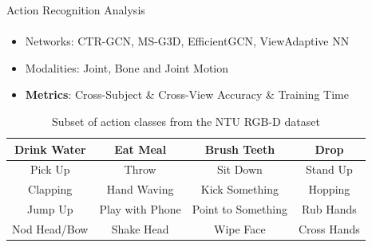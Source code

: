 \documentclass[aspectratio=169, xcolor=dvipsnames]{beamer}
\begin{document}
\begin{frame}{Action Recognition Analysis}
      \framesubtitle{}%
      
      \begin{itemize}
      \item Networks: CTR-GCN, MS-G3D, EfficientGCN, ViewAdaptive NN
      \item Modalities: Joint, Bone and Joint Motion
      \item \textbf{Metrics}: Cross-Subject \& Cross-View Accuracy \& Training Time
      \end{itemize}
      \vfill
      \begin{table}[ht!]
      \centering
      {\footnotesize
      \begin{tabular}{ |c|c|c|c| } 
              \hline
              Drink Water & Eat Meal & Brush Teeth & Drop \\ 
              \hline
              Pick Up & Throw & Sit Down & Stand Up \\ 
              \hline
              Clapping & Hand Waving & Kick Something & Hopping \\ 
              \hline
              Jump Up & Play with Phone & Point to Something & Rub Hands \\
              \hline
              Nod Head/Bow & Shake Head & Wipe Face & Cross Hands \\
              \hline
      \end{tabular}
      }
      \caption{Subset of action classes from the NTU RGB-D dataset}
      \end{table}
\end{frame}
\end{document}
